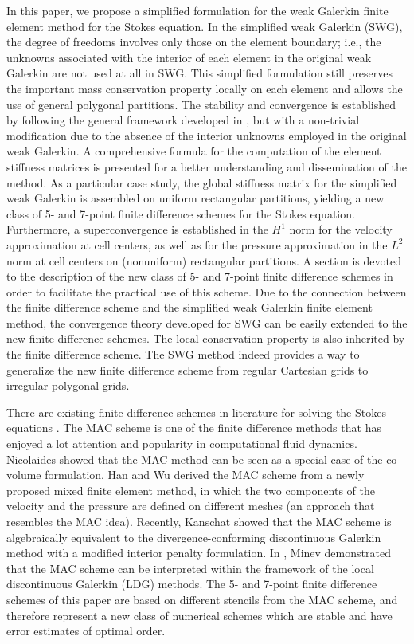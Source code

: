 \documentclass[final,leqno]{siamltex704}
\begin{document}
In this paper, we propose a simplified formulation for the weak Galerkin finite element method for the Stokes equation. In the simplified weak Galerkin (SWG), the degree of freedoms involves only those on the element boundary; i.e., the unknowns associated with the interior of each element in the original weak Galerkin are not used at all in SWG. This simplified formulation still preserves the important mass conservation property locally on each element and allows the use of general polygonal partitions. The stability and convergence is established by following the general framework developed in \cite{wy-stokes}, but with a non-trivial modification due to the absence of the interior unknowns employed in the original weak Galerkin. A comprehensive formula for the computation of the element stiffness matrices is presented for a better understanding and dissemination of the method. As a particular case study, the global stiffness matrix for the simplified weak Galerkin is assembled on uniform rectangular partitions, yielding a new class of 5- and 7-point finite difference schemes for the Stokes equation. Furthermore, a superconvergence is established in the $H^1$ norm for the velocity approximation at cell centers, as well as for the pressure approximation in the $L^2$ norm at cell centers on (nonuniform) rectangular partitions. A section is devoted to the description of the new class of 5- and 7-point finite difference schemes in order to facilitate the practical use of this scheme. Due to the connection between the finite difference scheme and the simplified weak Galerkin finite element method, the convergence theory developed for SWG can be easily extended to the new finite difference schemes.
The local conservation property is also inherited by the finite difference scheme. The SWG method indeed provides a way to generalize the new finite difference scheme from regular Cartesian grids to irregular polygonal grids.

There are existing finite difference schemes in literature for solving the Stokes equations \cite{Welch-MAC,Strikwerda_1984,LTF-IJNMF-1995}. The MAC scheme \cite{Welch-MAC} is one of the finite difference methods that has enjoyed a lot attention and popularity in computational fluid dynamics. Nicolaides \cite{Nicolaides_1989} showed that the MAC method can be seen as a special case of the co-volume formulation. Han and Wu \cite{Han_Wu_1998} derived the MAC scheme from a newly proposed mixed finite element method, in which the two components of the velocity and the pressure are defined on different meshes (an approach that resembles the MAC idea). Recently, Kanschat \cite{Kanschat2008} showed that the MAC scheme is algebraically equivalent to the divergence-conforming discontinuous Galerkin method with a modified interior penalty formulation. In \cite{Minev_2008}, Minev demonstrated that the MAC scheme can be interpreted within the framework of the local discontinuous Galerkin (LDG) methods. The 5- and 7-point finite difference schemes of this paper are based on different stencils from the MAC scheme, and therefore represent a new class of numerical schemes which are stable and have error estimates of optimal order.
\end{document}
